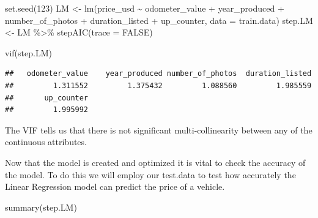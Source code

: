 \documentclass[
]{article}
\newenvironment{Shaded}{\begin{snugshade}}{\end{snugshade}}
\newcommand{\AttributeTok}[1]{\textcolor[rgb]{0.77,0.63,0.00}{#1}}
\newcommand{\ConstantTok}[1]{\textcolor[rgb]{0.00,0.00,0.00}{#1}}
\newcommand{\DecValTok}[1]{\textcolor[rgb]{0.00,0.00,0.81}{#1}}
\newcommand{\FunctionTok}[1]{\textcolor[rgb]{0.00,0.00,0.00}{#1}}
\newcommand{\NormalTok}[1]{#1}
\newcommand{\OtherTok}[1]{\textcolor[rgb]{0.56,0.35,0.01}{#1}}
\newcommand{\SpecialCharTok}[1]{\textcolor[rgb]{0.00,0.00,0.00}{#1}}
\begin{document}
\begin{Shaded}
\begin{Highlighting}[]
\FunctionTok{set.seed}\NormalTok{(}\DecValTok{123}\NormalTok{)}
\NormalTok{LM }\OtherTok{\textless{}{-}} \FunctionTok{lm}\NormalTok{(price\_usd }\SpecialCharTok{\textasciitilde{}}\NormalTok{ odometer\_value}
         \SpecialCharTok{+}\NormalTok{ year\_produced}
         \SpecialCharTok{+}\NormalTok{ number\_of\_photos}
         \SpecialCharTok{+}\NormalTok{ duration\_listed}
         \SpecialCharTok{+}\NormalTok{ up\_counter, }\AttributeTok{data =}\NormalTok{ train.data)}
\NormalTok{step.LM }\OtherTok{\textless{}{-}}\NormalTok{ LM }\SpecialCharTok{\%\textgreater{}\%} \FunctionTok{stepAIC}\NormalTok{(}\AttributeTok{trace =} \ConstantTok{FALSE}\NormalTok{)}
\end{Highlighting}
\end{Shaded}

\begin{Shaded}
\begin{Highlighting}[]
\FunctionTok{vif}\NormalTok{(step.LM)}
\end{Highlighting}
\end{Shaded}

\begin{verbatim}
##   odometer_value    year_produced number_of_photos  duration_listed 
##         1.311552         1.375432         1.088560         1.985559 
##       up_counter 
##         1.995992
\end{verbatim}

The VIF tells us that there is not significant multi-collinearity
between any of the continuous attributes.

Now that the model is created and optimized it is vital to check the
accuracy of the model. To do this we will employ our test.data to test
how accurately the Linear Regression model can predict the price of a
vehicle.

\begin{Shaded}
\begin{Highlighting}[]
\FunctionTok{summary}\NormalTok{(step.LM)}
\end{Highlighting}
\end{Shaded}
\end{document}
